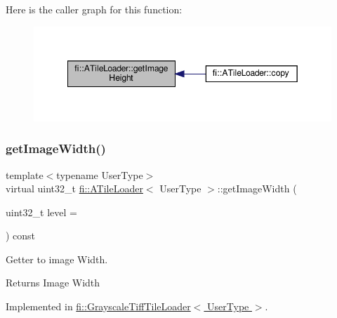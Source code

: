 Here is the caller graph for this function\+:
\nopagebreak
\begin{figure}[H]
\begin{center}
\leavevmode
\includegraphics[width=349pt]{dc/d54/classfi_1_1ATileLoader_a53fb257d3ec8f3fa3d5f6c58de859000_icgraph}
\end{center}
\end{figure}
\mbox{\label{classfi_1_1ATileLoader_ad775bcbdddf7da6bb3f857a53c075a86}} 
\subsubsection{\texorpdfstring{get\+Image\+Width()}{getImageWidth()}}
{\footnotesize\ttfamily template$<$typename User\+Type$>$ \\
virtual uint32\+\_\+t \hyperlink{classfi_1_1ATileLoader}{fi\+::\+A\+Tile\+Loader}$<$ User\+Type $>$\+::get\+Image\+Width (\begin{DoxyParamCaption}\item[{uint32\+\_\+t}]{level = {} }\end{DoxyParamCaption}) const\hspace{0.3cm}{\ttfamily [pure virtual]}}



Getter to image Width. 

\begin{DoxyReturn}{Returns}
Image Width 
\end{DoxyReturn}


Implemented in \hyperlink{classfi_1_1GrayscaleTiffTileLoader_ab20446c55b7ae2fea97490e76a73f934}{fi\+::\+Grayscale\+Tiff\+Tile\+Loader$<$ User\+Type $>$}.


